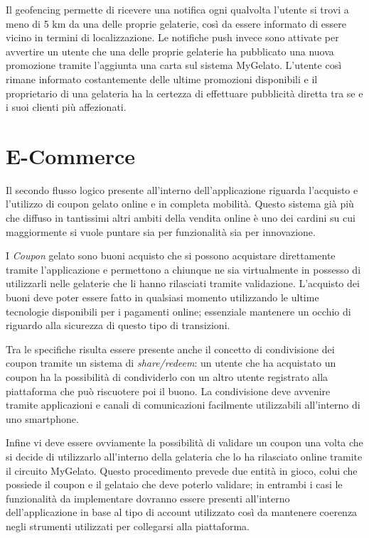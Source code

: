 Il geofencing permette di ricevere una notifica ogni qualvolta l'utente
si trovi a meno di 5 km da una delle proprie gelaterie, così da essere
informato di essere vicino in termini di localizzazione. Le notifiche
push invece sono attivate per avvertire un utente che una delle proprie
gelaterie ha pubblicato una nuova promozione tramite l'aggiunta una
carta sul sistema MyGelato. L'utente così rimane informato costantemente
delle ultime promozioni disponibili e il proprietario di una gelateria
ha la certezza di effettuare pubblicità diretta tra se e i suoi clienti
più affezionati.

\section{E-Commerce}

Il secondo flusso logico presente all'interno dell'applicazione riguarda
l'acquisto e l'utilizzo di coupon gelato online e in completa mobilità.
Questo sistema già più che diffuso in tantissimi altri ambiti della
vendita online è uno dei cardini su cui maggiormente si vuole puntare
sia per funzionalità sia per innovazione.\bigskip{}

I \emph{Coupon} gelato sono buoni acquisto che si possono acquistare
direttamente tramite l'applicazione e permettono a chiunque ne sia
virtualmente in possesso di utilizzarli nelle gelaterie che li hanno
rilasciati tramite validazione. L'acquisto dei buoni deve poter essere
fatto in qualsiasi momento utilizzando le ultime tecnologie disponibili
per i pagamenti online; essenziale mantenere un occhio di riguardo
alla sicurezza di questo tipo di transizioni.\bigskip{}

Tra le specifiche risulta essere presente anche il concetto di condivisione
dei coupon tramite un sistema di \emph{share/redeem}: un utente che
ha acquistato un coupon ha la possibilità di condividerlo con un altro
utente registrato alla piattaforma che può riscuotere poi il buono.
La condivisione deve avvenire tramite applicazioni e canali di comunicazioni
facilmente utilizzabili all'interno di uno smartphone.\bigskip{}

Infine vi deve essere ovviamente la possibilità di validare un coupon
una volta che si decide di utilizzarlo all'interno della gelateria
che lo ha rilasciato online tramite il circuito MyGelato. Questo procedimento
prevede due entità in gioco, colui che possiede il coupon e il gelataio
che deve poterlo validare; in entrambi i casi le funzionalità da implementare
dovranno essere presenti all'interno dell'applicazione in base al
tipo di account utilizzato così da mantenere coerenza negli strumenti
utilizzati per collegarsi alla piattaforma.

